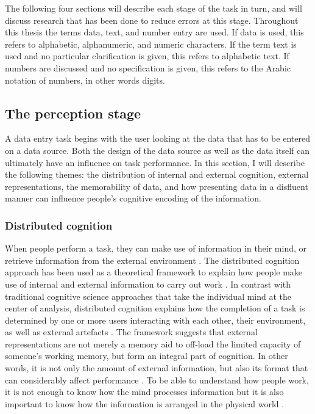 \documentclass[11pt,oneside]{report}
\begin{document}
The following four sections will describe each stage of the task in turn, and will discuss research that has been done to reduce errors at this stage. 
Throughout this thesis the terms data, text, and number entry are used. If data is used, this refers to alphabetic, alphanumeric, and numeric characters. 
If the term text is used and no particular clarification is given, this refers to alphabetic text. If numbers are discussed and no specification is given, this refers to the Arabic notation of numbers, in other words digits. 

\subsection{The perception stage}
A data entry task begins with the user looking at the data that has to be entered on a data source.
Both the design of the data source as well as the data itself can ultimately have an influence on task performance. In this section, I will describe the following themes: the distribution of internal and external cognition, external representations, the memorability of data, and how presenting data in a disfluent manner can influence people's cognitive encoding of the information.

\subsubsection{Distributed cognition}
When people perform a task, they can make use of information in their mind, or retrieve information from the external environment \citep{Norman1993}.
The distributed cognition approach has been used as a theoretical framework to explain how people make use of internal and external information to carry out work \citep{Hollan2000}. In contrast with traditional cognitive science approaches that take the individual mind at the center of analysis, distributed cognition explains how the completion of a task is determined by one or more users interacting with each other, their environment, as well as external artefacts \citep{Hutchins1995}. The framework suggests that external representations are not merely a memory aid to off-load the limited capacity of someone's working memory, but form an integral part of cognition. In other words, it is not only the amount of external information, but also its format that can considerably affect performance \citep{Gong2009, Zhang2009}.
To be able to understand how people work, it is not enough to know how the mind processes information but it is also important to know how the information is arranged in the physical world \citep{Hollan2000}. 
\end{document}
